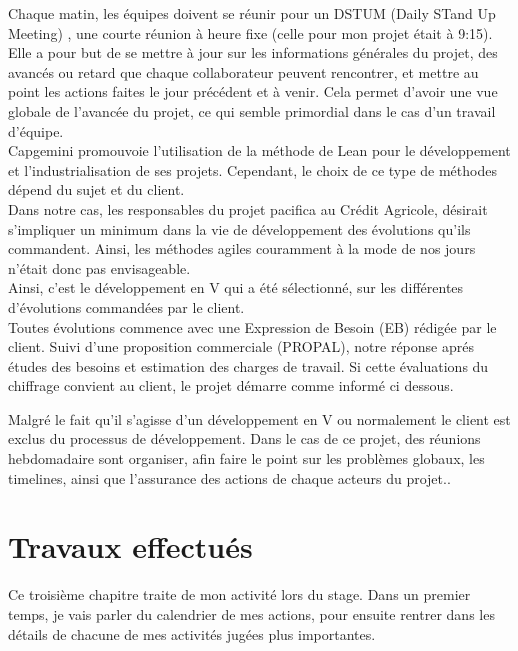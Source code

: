 \documentclass{rapport}
\begin{document}
Chaque matin, les équipes doivent se réunir pour un DSTUM (Daily STand Up Meeting) , une courte réunion à heure fixe (celle pour mon projet était à 9:15). Elle a pour but de se mettre à jour sur les informations générales du projet, des avancés ou retard que chaque collaborateur peuvent rencontrer, et mettre au point les actions faites le jour précédent et à venir. Cela permet d'avoir une vue globale de l'avancée du projet, ce qui semble primordial dans le cas d'un travail d'équipe.\\

Capgemini promouvoie l'utilisation de la méthode de Lean pour le développement et l'industrialisation de ses projets. Cependant, le choix de ce type de méthodes dépend du sujet et du client.\\ 
Dans notre cas, les responsables du projet pacifica au Crédit Agricole, désirait s'impliquer un minimum dans la vie de développement des évolutions qu'ils commandent. Ainsi, les méthodes agiles couramment à la mode de nos jours n'était donc pas envisageable.\\

Ainsi, c'est le développement en V qui a été sélectionné, sur les différentes d'évolutions commandées par le client.\\


Toutes évolutions commence avec une Expression de Besoin (EB) rédigée par le client. Suivi d'une proposition commerciale (PROPAL), notre réponse aprés études des besoins et estimation des charges de travail. Si cette évaluations du chiffrage convient au client, le projet démarre comme informé ci dessous.


Malgré le fait qu'il s'agisse d'un développement en V ou normalement le client est exclus du processus de développement. Dans le cas de ce projet, des réunions hebdomadaire sont organiser, afin faire le point sur les problèmes globaux, les timelines, ainsi que l'assurance des actions de chaque acteurs du projet..

\newpage

\section{Travaux effectués}

Ce troisième chapitre traite de mon activité lors du stage. Dans un premier temps, je vais parler du calendrier de mes actions, pour ensuite rentrer dans les détails de chacune de mes activités jugées plus importantes.
\end{document}
